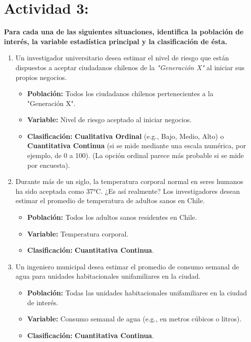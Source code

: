 \documentclass[12pt, letterpaper]{article}
\begin{document}
\newpage
\section{Actividad 3:}
\textbf{Para cada una de las siguientes situaciones, identifica la población de interés, la variable estadística principal y la clasificación de ésta.}

\begin{enumerate}
    \item Un investigador universitario desea estimar el nivel de riesgo que están dispuestos a aceptar ciudadanos chilenos de la \textit{"Generación X"} al iniciar sus propios negocios.
        \begin{itemize}
            \item \textbf{Población:} Todos los ciudadanos chilenos pertenecientes a la "Generación X".
            \item \textbf{Variable:} Nivel de riesgo aceptado al iniciar negocios.
            \item \textbf{Clasificación:} \textbf{Cualitativa Ordinal} (e.g., Bajo, Medio, Alto) o \textbf{Cuantitativa Continua} (si se mide mediante una escala numérica, por ejemplo, de 0 a 100). (La opción ordinal parece más probable si se mide por encuesta).
        \end{itemize}

    \item Durante más de un siglo, la temperatura corporal normal en seres humanos ha sido aceptada como 37°C. ¿Es así realmente? Los investigadores desean estimar el promedio de temperatura de adultos sanos en Chile.
        \begin{itemize}
            \item \textbf{Población:} Todos los adultos sanos residentes en Chile.
            \item \textbf{Variable:} Temperatura corporal.
            \item \textbf{Clasificación:} \textbf{Cuantitativa Continua}.
        \end{itemize}

    \item Un ingeniero municipal desea estimar el promedio de consumo semanal de agua para unidades habitacionales unifamiliares en la ciudad.
        \begin{itemize}
            \item \textbf{Población:} Todas las unidades habitacionales unifamiliares en la ciudad de interés.
            \item \textbf{Variable:} Consumo semanal de agua (e.g., en metros cúbicos o litros).
            \item \textbf{Clasificación:} \textbf{Cuantitativa Continua}.
        \end{itemize}


\end{enumerate}
\end{document}
